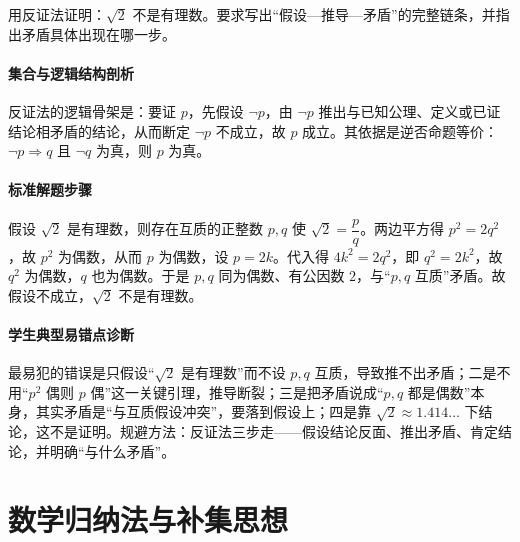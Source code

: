 \begin{problem}
用反证法证明：$\sqrt{2}$ 不是有理数。要求写出“假设—推导—矛盾”的完整链条，并指出矛盾具体出现在哪一步。
\end{problem}
\begin{solution}
\paragraph{集合与逻辑结构剖析}
反证法的逻辑骨架是：要证 $p$，先假设 $\neg p$，由 $\neg p$ 推出与已知公理、定义或已证结论相矛盾的结论，从而断定 $\neg p$ 不成立，故 $p$ 成立。其依据是逆否命题等价：$\neg p\Rightarrow q$ 且 $\neg q$ 为真，则 $p$ 为真。
\paragraph{标准解题步骤}
假设 $\sqrt2$ 是有理数，则存在互质的正整数 $p,q$ 使 $\sqrt2=\dfrac pq$。两边平方得 $p^2=2q^2$，故 $p^2$ 为偶数，从而 $p$ 为偶数，设 $p=2k$。代入得 $4k^2=2q^2$，即 $q^2=2k^2$，故 $q^2$ 为偶数，$q$ 也为偶数。于是 $p,q$ 同为偶数、有公因数 $2$，与“$p,q$ 互质”矛盾。故假设不成立，$\sqrt2$ 不是有理数。
\paragraph{学生典型易错点诊断}
最易犯的错误是只假设“$\sqrt2$ 是有理数”而不设 $p,q$ 互质，导致推不出矛盾；二是不用“$p^2$ 偶则 $p$ 偶”这一关键引理，推导断裂；三是把矛盾说成“$p,q$ 都是偶数”本身，其实矛盾是“与互质假设冲突”，要落到假设上；四是靠 $\sqrt2\approx1.414\ldots$ 下结论，这不是证明。规避方法：反证法三步走——假设结论反面、推出矛盾、肯定结论，并明确“与什么矛盾”。
\end{solution}

\section{数学归纳法与补集思想}

